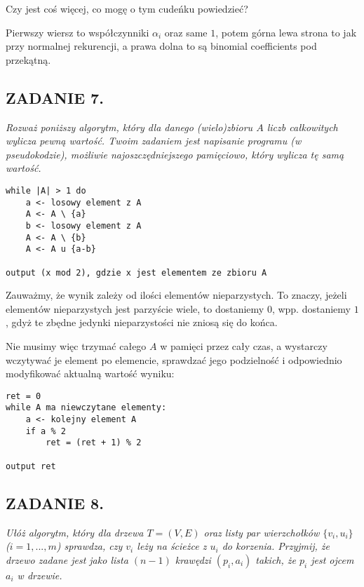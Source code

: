 \documentclass{article}
\begin{document}
{\color{orange}Czy jest coś więcej, co mogę o tym cudeńku powiedzieć?}

Pierwszy wiersz to współczynniki $\alpha_i$ oraz same $1$, potem górna lewa strona to jak przy normalnej rekurencji, a prawa dolna to są binomial coefficients pod przekątną.

\subsection*{ZADANIE 7.}
\emph{Rozważ poniższy algorytm, który dla danego (wielo)zbioru $A$ liczb całkowitych wylicza pewną wartość. Twoim zadaniem jest napisanie programu (w pseudokodzie), możliwie najoszczędniejszego pamięciowo, który wylicza tę samą wartość.}

\begin{lstlisting}
while |A| > 1 do
    a <- losowy element z A
    A <- A \ {a}
    b <- losowy element z A
    A <- A \ {b}
    A <- A u {a-b}

output (x mod 2), gdzie x jest elementem ze zbioru A
\end{lstlisting}
\smallskip

Zauważmy, że wynik zależy od ilości elementów nieparzystych. To znaczy, jeżeli elementów nieparzystych jest parzyście wiele, to dostaniemy $0$, wpp. dostaniemy $1$, gdyż te zbędne jedynki nieparzystości nie zniosą się do końca.

Nie musimy więc trzymać całego $A$ w pamięci przez cały czas, a wystarczy wczytywać je element po elemencie, sprawdzać jego podzielność i odpowiednio modyfikować aktualną wartość wyniku:
\begin{lstlisting}
ret = 0
while A ma niewczytane elementy:
    a <- kolejny element A
    if a % 2
        ret = (ret + 1) % 2
    
output ret
\end{lstlisting}

\subsection*{ZADANIE 8.}
\emph{Ułóż algorytm, który dla drzewa $T=(V, E)$ oraz listy par wierzchołków $\{v_i,u_i\}$ ($i=1,...,m$) sprawdza, czy $v_i$ leży na ścieżce z $u_i$ do korzenia. Przyjmij, że drzewo zadane jest jako lista $(n-1)$ krawędzi $(p_i,a_i)$ takich, że $p_i$ jest ojcem $a_i$ w drzewie.}

\end{document}
